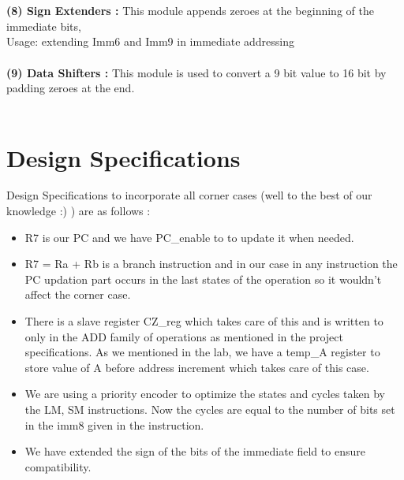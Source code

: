 \documentclass[11pt,fleqn,oneside]{book} %
\begin{document}
\\ \\ \textbf{(8) Sign Extenders :} This module appends zeroes at the beginning of the immediate bits, \\ Usage: extending Imm6 and Imm9 in immediate addressing
 \\ \\ \textbf{(9) Data Shifters :} This module is used  to convert a 9 bit value to 16 bit by padding zeroes at the end.\\ \\
 
 \section{Design Specifications}
Design Specifications to incorporate all corner cases (well to the best of our knowledge :)  ) are as follows :
\begin{itemize}
\item R7 is our PC and  we have PC\_enable to to update it when needed.
\item R7 = Ra + Rb is a branch instruction and in our case in any instruction the PC updation part occurs in the last states of the operation so it wouldn't affect the corner case.
\item There is a slave register CZ\_reg which takes care of this and is written to only in the ADD family of operations as mentioned in the project specifications.
As we mentioned in the lab, we have a temp\_A register to store value of A before address increment which takes care of this case.
\item We are using a priority encoder to optimize the states and cycles taken by the LM, SM instructions. Now the  cycles are equal to the number of bits set in the imm8 given in the instruction. 
\item We have extended the sign of the bits of the immediate field to ensure compatibility. 
\end{itemize}
\newpage
\end{document}
